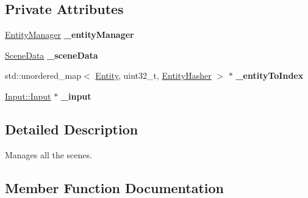 \subsection*{Private Attributes}
\begin{DoxyCompactItemize}
\item 
\hyperlink{class_ensum_1_1_components_1_1_entity_manager}{Entity\+Manager} {\bfseries \+\_\+entity\+Manager}\hypertarget{class_ensum_1_1_components_1_1_scene_manager_aa4f54931996a70ad663bbcfc3a4f7024}{}\label{class_ensum_1_1_components_1_1_scene_manager_aa4f54931996a70ad663bbcfc3a4f7024}

\item 
\hyperlink{struct_ensum_1_1_components_1_1_scene_manager_1_1_scene_data}{Scene\+Data} {\bfseries \+\_\+scene\+Data}\hypertarget{class_ensum_1_1_components_1_1_scene_manager_a8b83f00b84c55e4bae12d95a588671aa}{}\label{class_ensum_1_1_components_1_1_scene_manager_a8b83f00b84c55e4bae12d95a588671aa}

\item 
std\+::unordered\+\_\+map$<$ \hyperlink{struct_ensum_1_1_components_1_1_entity}{Entity}, uint32\+\_\+t, \hyperlink{struct_ensum_1_1_components_1_1_entity_hasher}{Entity\+Hasher} $>$ $\ast$ {\bfseries \+\_\+entity\+To\+Index}\hypertarget{class_ensum_1_1_components_1_1_scene_manager_afe20076d039658cc2f4cad3c22b644bc}{}\label{class_ensum_1_1_components_1_1_scene_manager_afe20076d039658cc2f4cad3c22b644bc}

\item 
\hyperlink{class_ensum_1_1_input_1_1_input}{Input\+::\+Input} $\ast$ {\bfseries \+\_\+input}\hypertarget{class_ensum_1_1_components_1_1_scene_manager_a997e4d367f66c9f80d27e027999f6802}{}\label{class_ensum_1_1_components_1_1_scene_manager_a997e4d367f66c9f80d27e027999f6802}

\end{DoxyCompactItemize}


\subsection{Detailed Description}
Manages all the scenes. 

\subsection{Member Function Documentation}
